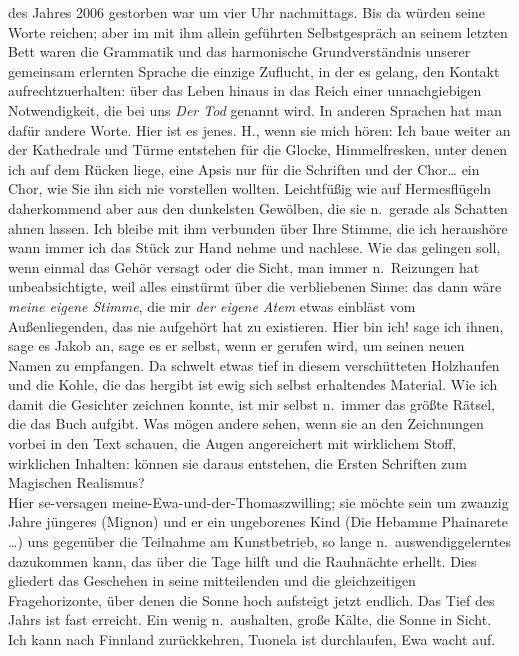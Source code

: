 \documentclass[
]{article}
\begin{document}
des Jahres 2006 gestorben war um vier Uhr nachmittags. Bis da würden
seine Worte reichen; aber im mit ihm allein geführten Selbstgespräch an
seinem letzten Bett waren die Grammatik und das harmonische
Grundverständnis unserer gemeinsam erlernten Sprache die einzige
Zuflucht, in der es gelang, den Kontakt aufrechtzuerhalten: über das
Leben hinaus in das Reich einer unnachgiebigen Notwendigkeit, die bei
uns \emph{Der Tod} genannt wird. In anderen Sprachen hat man dafür
andere Worte. Hier ist es jenes. H., wenn sie mich hören: Ich baue
weiter an der Kathedrale und Türme entstehen für die Glocke,
Himmelfresken, unter denen ich auf dem Rücken liege, eine Apsis nur für
die Schriften und der Chor\ldots{} ein Chor, wie Sie ihn sich nie
vorstellen wollten. Leichtfüßig wie auf Hermesflügeln daherkommend aber
aus den dunkelsten Gewölben, die sie n.~gerade als Schatten ahnen
lassen. Ich bleibe mit ihm verbunden über Ihre Stimme, die ich
heraushöre wann immer ich das Stück zur Hand nehme und nachlese. Wie das
gelingen soll, wenn einmal das Gehör versagt oder die Sicht, man immer
n.~Reizungen hat unbeabsichtigte, weil alles einstürmt über die
verbliebenen Sinne: das dann wäre \emph{meine eigene Stimme}, die mir
\emph{der eigene Atem} etwas einbläst vom Außenliegenden, das nie
aufgehört hat zu existieren. Hier bin ich! sage ich ihnen, sage es Jakob
an, sage es er selbst, wenn er gerufen wird, um seinen neuen Namen zu
empfangen. Da schwelt etwas tief in diesem verschütteten Holzhaufen und
die Kohle, die das hergibt ist ewig sich selbst erhaltendes Material.
Wie ich damit die Gesichter zeichnen konnte, ist mir selbst n.~immer das
größte Rätsel, die das Buch aufgibt. Was mögen andere sehen, wenn sie an
den Zeichnungen vorbei in den Text schauen, die Augen angereichert mit
wirklichem Stoff, wirklichen Inhalten: können sie daraus entstehen, die
Ersten Schriften zum Magischen Realismus?\\
Hier se-versagen meine-Ewa-und-der-Thomaszwilling; sie möchte sein um
zwanzig Jahre jüngeres (Mignon) und er ein ungeborenes Kind (Die Hebamme
Phainarete \ldots) uns gegenüber die Teilnahme am Kunstbetrieb, so lange
n.~auswendiggelerntes dazukommen kann, das über die Tage hilft und die
Rauhnächte erhellt. Dies gliedert das Geschehen in seine mitteilenden
und die gleichzeitigen Fragehorizonte, über denen die Sonne hoch
aufsteigt jetzt endlich. Das Tief des Jahrs ist fast erreicht. Ein wenig
n.~aushalten, große Kälte, die Sonne in Sicht. Ich kann nach Finnland
zurückkehren, Tuonela ist durchlaufen, Ewa wacht auf.\\
\end{document}
